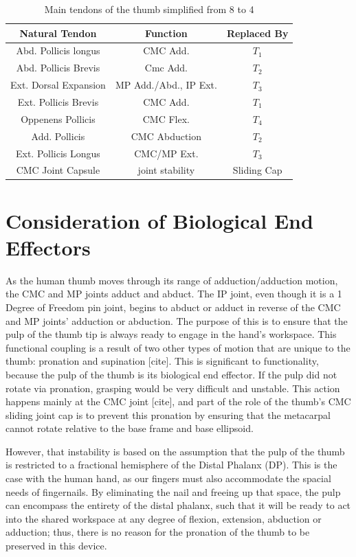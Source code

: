 \documentclass[letterpaper, 10 pt, conference]{ieeeconf}  %
\begin{document}
\begin{table}
	\centering
	\caption{Main tendons of the thumb simplified from 8 to 4}\label{tendonchoice}
	\begin{tabular}{c|c|c}
		Natural Tendon & Function & Replaced By \\
		\hline
		Abd. Pollicis longus & CMC Add. & $T_1$ \\
		Abd. Pollicis Brevis & Cmc Add. & $T_2$ \\
		Ext. Dorsal Expansion & MP Add./Abd., IP Ext. & $T_3$\\
		Ext. Pollicis Brevis & CMC Add. & $T_1$\\
		Oppenens Pollicis & CMC Flex. & $T_4$ \\
		Add. Pollicis & CMC Abduction & $T_2$ \\
		Ext. Pollicis Longus & CMC/MP Ext. & $T_3$\\
		CMC Joint Capsule & joint stability & Sliding Cap\\
		\hline
	\end{tabular}
\end{table}

\section{Consideration of Biological End Effectors}\label{concepts}

As the human thumb moves through its range of adduction/adduction motion, the CMC and MP joints adduct and abduct. The IP joint, even though it is a 1 Degree of Freedom pin joint, begins to abduct or adduct in reverse of the CMC and MP joints' adduction or abduction. The purpose of this is to ensure that the pulp of the thumb tip is always ready to engage in the hand's workspace. This functional coupling is a result of two other types of motion that are unique to the thumb: pronation and supination [cite]. This is significant to functionality, because the pulp of the thumb is its biological end effector. If the pulp did not rotate via pronation, grasping would be very difficult and unstable. This action happens mainly at the CMC joint [cite], and part of the role of the thumb's CMC sliding joint cap is to prevent this pronation by ensuring that the metacarpal cannot rotate relative to the base frame and base ellipsoid.

However, that instability is based on the assumption that the pulp of the thumb is restricted to a fractional hemisphere of the Distal Phalanx (DP). This is the case with the human hand, as our fingers must also accommodate the spacial needs of fingernails. By eliminating the nail and freeing up that space, the pulp can encompass the entirety of the distal phalanx, such that it will be ready to act into the shared workspace at any degree of flexion, extension, abduction or adduction; thus, there is no reason for the pronation of the thumb to be preserved in this device.
\end{document}
